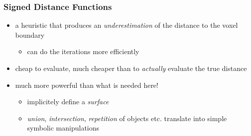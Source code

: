 \documentclass{beamer}
\begin{document}
\begin{frame}
\begin{figure}
  \end{figure}
\end{frame}


\begin{frame}
  \frametitle{Signed Distance Functions}

  \begin{itemize}
  \item a heuristic that produces an \textsl{underestimation} of the distance to the voxel boundary
    \begin{itemize}
      \item can do the iterations more efficiently
    \end{itemize}
  \item cheap to evaluate, much cheaper than to \textsl{actually} evaluate the true distance
    \pause
  \item much more powerful than what is needed here!
    \begin{itemize}
    \item implicitely define a \textsl{surface}
    \item \textsl{union}, \textsl{intersection}, \textsl{repetition} of objects etc. translate into simple symbolic manipulations
    \end{itemize}
  \end{itemize}
\end{frame}
\end{document}
